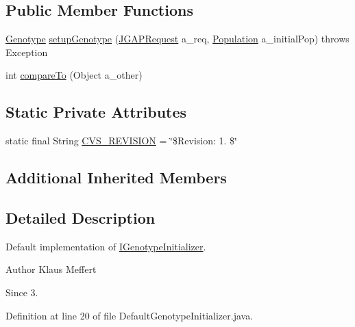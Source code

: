 \subsection*{Public Member Functions}
\begin{DoxyCompactItemize}
\item 
\hyperlink{classorg_1_1jgap_1_1_genotype}{Genotype} \hyperlink{classorg_1_1jgap_1_1distr_1_1grid_1_1_default_genotype_initializer_a5a4c76fbcaa25a8497dbbcd250a03fff}{setup\-Genotype} (\hyperlink{classorg_1_1jgap_1_1distr_1_1grid_1_1_j_g_a_p_request}{J\-G\-A\-P\-Request} a\-\_\-req, \hyperlink{classorg_1_1jgap_1_1_population}{Population} a\-\_\-initial\-Pop)  throws Exception 
\item 
int \hyperlink{classorg_1_1jgap_1_1distr_1_1grid_1_1_default_genotype_initializer_a62d5455d705b544af443ed5d29fdd327}{compare\-To} (Object a\-\_\-other)
\end{DoxyCompactItemize}
\subsection*{Static Private Attributes}
\begin{DoxyCompactItemize}
\item 
static final String \hyperlink{classorg_1_1jgap_1_1distr_1_1grid_1_1_default_genotype_initializer_a215d4d03f358bbf7a085d156b21ba620}{C\-V\-S\-\_\-\-R\-E\-V\-I\-S\-I\-O\-N} = \char`\"{}\$Revision\-: 1. \$\char`\"{}
\end{DoxyCompactItemize}
\subsection*{Additional Inherited Members}


\subsection{Detailed Description}
Default implementation of \hyperlink{interfaceorg_1_1jgap_1_1distr_1_1grid_1_1_i_genotype_initializer}{I\-Genotype\-Initializer}.

\begin{DoxyAuthor}{Author}
Klaus Meffert 
\end{DoxyAuthor}
\begin{DoxySince}{Since}
3. 
\end{DoxySince}


Definition at line 20 of file Default\-Genotype\-Initializer.\-java.



